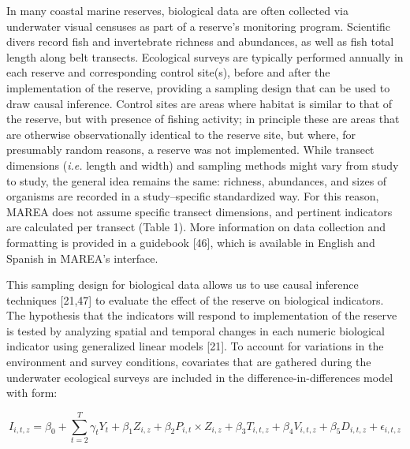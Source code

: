 \documentclass[12pt,]{article}
\begin{document}
In many coastal marine reserves, biological data are often collected via
underwater visual censuses as part of a reserve's monitoring program.
Scientific divers record fish and invertebrate richness and abundances,
as well as fish total length along belt transects. Ecological surveys
are typically performed annually in each reserve and corresponding
control site(s), before and after the implementation of the reserve,
providing a sampling design that can be used to draw causal inference.
Control sites are areas where habitat is similar to that of the reserve,
but with presence of fishing activity; in principle these are areas that
are otherwise observationally identical to the reserve site, but where,
for presumably random reasons, a reserve was not implemented. While
transect dimensions (\emph{i.e.} length and width) and sampling methods
might vary from study to study, the general idea remains the same:
richness, abundances, and sizes of organisms are recorded in a
study--specific standardized way. For this reason, MAREA does not assume
specific transect dimensions, and pertinent indicators are calculated
per transect (Table 1). More information on data collection and
formatting is provided in a guidebook {[}46{]}, which is available in
English and Spanish in MAREA's interface.

This sampling design for biological data allows us to use causal
inference techniques {[}21,47{]} to evaluate the effect of the reserve
on biological indicators. The hypothesis that the indicators will
respond to implementation of the reserve is tested by analyzing spatial
and temporal changes in each numeric biological indicator using
generalized linear models {[}21{]}. To account for variations in the
environment and survey conditions, covariates that are gathered during
the underwater ecological surveys are included in the
difference-in-differences model with form:

\begin{equation}I_{i,t,z}=\beta_0 + \sum_{t = 2}^T\gamma_{t}Y_t + \beta_1Z_{i,z} + \beta_2P_{i,t}\times Z_{i,z} + \beta_3T_{i,t,z} + \beta_4V_{i,t,z} + \beta_5D_{i,t,z} + \epsilon_{i,t,z}\end{equation}
\end{document}

